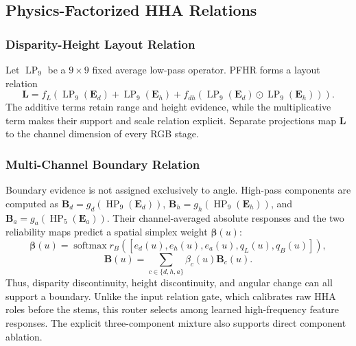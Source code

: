\documentclass[a4paper,fleqn]{cas-dc}
\begin{document}
\subsection{Physics-Factorized HHA Relations}

\subsubsection{Disparity-Height Layout Relation}

Let $\operatorname{LP}_{9}$ be a $9\times9$ fixed average low-pass operator. PFHR forms a layout relation
\begin{equation}
  \mathbf{L}=f_L\!\left(
  \operatorname{LP}_{9}(\mathbf{E}_{d})+
  \operatorname{LP}_{9}(\mathbf{E}_{h})+
  f_{dh}\!\left(
  \operatorname{LP}_{9}(\mathbf{E}_{d})\odot
  \operatorname{LP}_{9}(\mathbf{E}_{h})\right)\right).
\end{equation}
The additive terms retain range and height evidence, while the multiplicative term makes their support and scale relation explicit. Separate projections map $\mathbf{L}$ to the channel dimension of every RGB stage.

\subsubsection{Multi-Channel Boundary Relation}

Boundary evidence is not assigned exclusively to angle. High-pass components are computed as $\mathbf{B}_{d}=g_d(\operatorname{HP}_{9}(\mathbf{E}_{d}))$, $\mathbf{B}_{h}=g_h(\operatorname{HP}_{9}(\mathbf{E}_{h}))$, and $\mathbf{B}_{a}=g_a(\operatorname{HP}_{5}(\mathbf{E}_{a}))$. Their channel-averaged absolute responses and the two reliability maps predict a spatial simplex weight $\boldsymbol{\beta}(u)$:
\begin{equation}
  \boldsymbol{\beta}(u)=\operatorname{softmax}
  r_B([e_d(u),e_h(u),e_a(u),q_L(u),q_B(u)]),
\end{equation}
\begin{equation}
  \mathbf{B}(u)=\sum_{c\in\{d,h,a\}}\beta_c(u)\mathbf{B}_c(u).
\end{equation}
Thus, disparity discontinuity, height discontinuity, and angular change can all support a boundary. Unlike the input relation gate, which calibrates raw HHA roles before the stems, this router selects among learned high-frequency feature responses. The explicit three-component mixture also supports direct component ablation.
\end{document}
